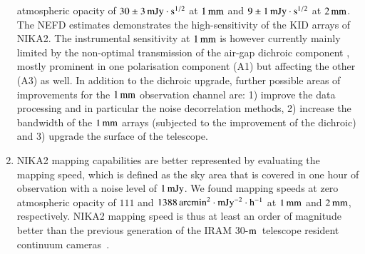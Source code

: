 \documentclass[traditionalabstract]{aa}
\newcommand{\hls}{HLS\,J0918+5142}
\newcommand{\trentemetre}{30-$\rm{m}$}
\newcommand{\lp}[1]{#1}
\begin{document}
\begin{enumerate}
  atmospheric opacity of $30 \pm 3\,\rm{mJy}\cdot s^{1/2}$ at $1\, \rm{mm}$ and
  $9 \pm 1\,\rm{mJy}\cdot s^{1/2}$ at $2\, \rm{mm}$.
  The NEFD estimates demonstrates the high-sensitivity of
  the KID arrays of NIKA2. 
  The instrumental sensitivity at $1\,\rm{mm}$
  is however currently mainly limited by the non-optimal transmission of
  the air-gap dichroic component%
  , mostly prominent in one polarisation component
  (A1) but affecting the other (A3) as well.
  In addition to the dichroic upgrade, further possible areas of
  improvements for the $1\,\rm{mm}$ observation channel are: 1)
  improve the data processing and in particular the noise
  decorrelation methods, 2) increase the bandwidth of the $1\,\rm{mm}$
  arrays (subjected to the improvement of the dichroic) and 3)
  upgrade the surface of the telescope.
   \vspace{1mm}
\item  NIKA2 mapping capabilities are better represented by evaluating the
  mapping speed, which is defined as the sky area that is covered in one
  hour of observation with a noise level of $1\,\rm{mJy}$. We found
  mapping speeds at zero atmospheric opacity of $111$ and
  $1388\, \rm{arcmin}^2 \cdot \rm{mJy}^{-2} \cdot \rm{h}^{-1}$ at
  $1\, \rm{mm}$ and  $2\, \rm{mm}$, respectively. NIKA2 mapping speed is thus at
  least an order of magnitude better than the previous generation of the IRAM
 \trentemetre\ telescope resident continuum cameras~\citep{Catalano2014, Staguhn2011_GISMO, Kreysa1999}.
  
\end{enumerate}
\end{document}
